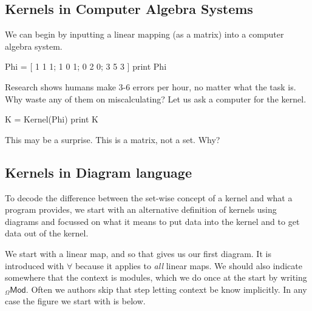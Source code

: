 \documentclass[12pt,twoside,dvipsnames,letterpaper]{memoir}
\begin{document}
\subsection{Kernels in Computer Algebra Systems}
We can begin by inputting a linear mapping (as a matrix) into a computer algebra
system.
\begin{notebookin}
Phi = [ 1 1 1; 1 0 1; 0 2 0; 3 5 3 ]
print Phi
\end{notebookin}
\begin{notebookout}[\thenotebookcounter]
[ 1 1 0 3 ]
[ 1 0 2 5 ]
[ 1 1 0 3 ]
\end{notebookout}
Research shows humans make 3-6 errors per hour, no matter 
what the task is.  Why waste any of 
them on miscalculating?  Let us ask a computer for the kernel.
\begin{notebookin}
K = Kernel(Phi)
print K
\end{notebookin}
\begin{notebookout}[\thenotebookcounter]
[ -2 -5 ]
[  2  2 ]
[  1  0 ]
[  0  1 ]
\end{notebookout}
This may be a surprise.  This is a matrix, not a 
set.  Why?


\subsection{Kernels in Diagram language}
To decode the difference between the set-wise concept of a kernel 
and what a program provides, we start with an alternative definition of kernels 
using diagrams and focussed on what it means to put data into the kernel
and to get data out of the kernel.

We start with a linear map, and so that gives us our first diagram.
It is introduced with $\forall$ because it applies to \emph{all} linear maps.
We should also indicate somewhere that the context is modules, which 
we do once at the start by writing ${_{\Omega} \mathsf{Mod}}$.  Often 
we authors skip that step letting context be know implicitly.  In any case
the figure we start with is below.
\begin{center}
\end{center}
\end{document}
